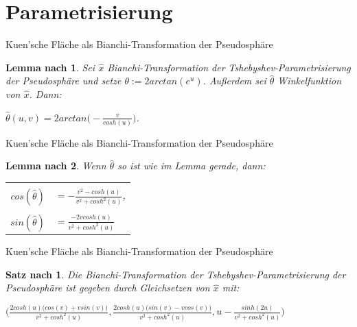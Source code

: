 \documentclass[12pt]{beamer}
\newtheorem{mythm}{Satz nach \cite{gray}}
\newtheorem{mylem}{Lemma nach \cite{gray}}
\begin{document}
\section{Parametrisierung}
\begin{frame}{Kuen'sche Fläche als Bianchi-Transformation der Pseudosphäre}
\begin{mylem}
Sei $\hat{x}$ Bianchi-Transformation der Tshebyshev-Parametrisierung der Pseudosphäre und setze $\theta := 2arctan(e^u)$.
Außerdem sei $\hat{\theta}$ Winkelfunktion von $\hat{x}$. Dann:
\begin{center}
$\hat{\theta}(u,v) = 2arctan\big(-\frac{v}{cosh(u)}\big)$.
\end{center}
\end{mylem}
\end{frame}

\begin{frame}{Kuen'sche Fläche als Bianchi-Transformation der Pseudosphäre}
\begin{mylem}
Wenn $\hat{\theta}$ so ist wie im Lemma gerade, dann:
\begin{tabular}{rl}
&\\
$cos(\hat{\theta})$ & $ = -\frac{v^2 - cosh(u)}{v^2 + cosh^2(u)}$,\\
&\\
$sin(\hat{\theta})$ & $ = \frac{-2v cosh(u)}{v^2 + cosh^2(u)}$
\end{tabular}

\end{mylem}
\end{frame}

\begin{frame}{Kuen'sche Fläche als Bianchi-Transformation der Pseudosphäre}
\begin{mythm}
Die Bianchi-Transformation der Tshebyshev-Parametrisierung der Pseudosphäre ist gegeben durch Gleichsetzen von $\hat{x}$ mit:
\begin{center}
$\Big(\frac{2cosh(u)\big(cos(v) + v sin(v)\big)}{v^2 + cosh^2(u)}, \frac{2cosh(u)\big(sin(v) - v cos(v)\big)}{v^2 + cosh^2(u)}, u - \frac{sinh(2u)}{v^2 + cosh^2(u)}\Big)$
\end{center}
\end{mythm}
\end{frame}
\end{document}
